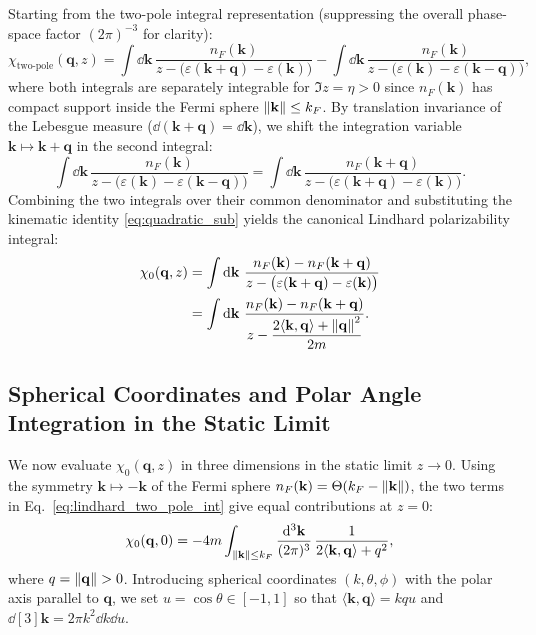 \documentclass[11pt, a4paper]{article}
\numberwithin{equation}{section}
\begin{document}
Starting from the two-pole integral representation (suppressing the overall phase-space factor $(2\pi)^{-3}$ for clarity):
\begin{equation}\label{eq:lindhard_two_pole_int}
  \chi_{\mathrm{two\text{-}pole}}(\mathbf{q}, z)
  = \int \dd{\mathbf{k}} \, \frac{n_F(\mathbf{k})}{z - \big(\varepsilon(\mathbf{k}+\mathbf{q}) - \varepsilon(\mathbf{k})\big)}
  - \int \dd{\mathbf{k}} \, \frac{n_F(\mathbf{k})}{z - \big(\varepsilon(\mathbf{k}) - \varepsilon(\mathbf{k}-\mathbf{q})\big)},
\end{equation}
where both integrals are separately integrable for $\Im z = \eta > 0$ since $n_F(\mathbf{k})$ has compact support inside the Fermi sphere $\norm{\mathbf{k}} \le k_F$. By translation invariance of the Lebesgue measure ($\dd{(\mathbf{k}+\mathbf{q})} = \dd{\mathbf{k}}$), we shift the integration variable $\mathbf{k} \mapsto \mathbf{k} + \mathbf{q}$ in the second integral:
\begin{equation}
  \int \dd{\mathbf{k}} \, \frac{n_F(\mathbf{k})}{z - \big(\varepsilon(\mathbf{k}) - \varepsilon(\mathbf{k}-\mathbf{q})\big)}
  = \int \dd{\mathbf{k}} \, \frac{n_F(\mathbf{k}+\mathbf{q})}{z - \big(\varepsilon(\mathbf{k}+\mathbf{q}) - \varepsilon(\mathbf{k})\big)}.
\end{equation}
Combining the two integrals over their common denominator and substituting the kinematic identity \eqref{eq:quadratic_sub} yields the canonical Lindhard polarizability integral:
\begin{align}
  \chi_0(\mathbf{q}, z)
  &= \int \dd{\mathbf{k}} \, \frac{n_F(\mathbf{k}) - n_F(\mathbf{k}+\mathbf{q})}{z - \big(\varepsilon(\mathbf{k}+\mathbf{q}) - \varepsilon(\mathbf{k})\big)} \nonumber \\
  &= \int \dd{\mathbf{k}} \, \frac{n_F(\mathbf{k}) - n_F(\mathbf{k}+\mathbf{q})}{z - \dfrac{2 \langle \mathbf{k}, \mathbf{q} \rangle + \norm{\mathbf{q}}^2}{2m}}. \label{eq:lindhard_canonical}
\end{align}

\subsection{Spherical Coordinates and Polar Angle Integration in the Static Limit}

We now evaluate $\chi_0(\mathbf{q}, z)$ in three dimensions in the static limit $z \to 0$. Using the symmetry $\mathbf{k} \mapsto -\mathbf{k}$ of the Fermi sphere $n_F(\mathbf{k}) = \Theta(k_F - \norm{\mathbf{k}})$, the two terms in Eq.~\eqref{eq:lindhard_two_pole_int} give equal contributions at $z = 0$:
\begin{equation}
  \chi_0(\mathbf{q}, 0)
  = -4m \int_{\norm{\mathbf{k}} \le k_F} \frac{\dd[3]{\mathbf{k}}}{(2\pi)^3} \, \frac{1}{2 \langle \mathbf{k}, \mathbf{q} \rangle + q^2},
\end{equation}
where $q = \norm{\mathbf{q}} > 0$. Introducing spherical coordinates $(k, \theta, \phi)$ with the polar axis parallel to $\mathbf{q}$, we set $u = \cos\theta \in [-1, 1]$ so that $\langle \mathbf{k}, \mathbf{q} \rangle = k q u$ and $\dd[3]{\mathbf{k}} = 2\pi k^2 \dd{k} \dd{u}$.
\end{document}
